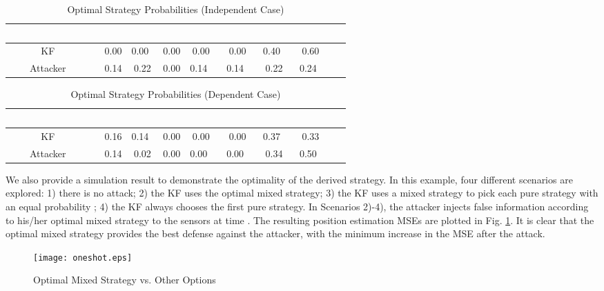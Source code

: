 \documentclass{article}
\begin{document}
  \begin{table}
	
 \caption{Optimal Strategy Probabilities (Independent Case)}
\vspace{0.1in}
{\footnotesize
  	\begin{tabular}{|c|c|c|c|c|c|c|c|}
		  	\hline
  	          &    &   &   &  &  &  &  \\ \hline
  	    KF       & 0.00 & 0.00  & 0.00 & 0.00  & 0.00  & 0.40   & 0.60     \\ 
  	    Attacker       & 0.14 & 0.22 & 0.00 & 0.14   & 0.14   & 0.22  & 0.24      \\ 
   \hline
  	\end{tabular}
  	}
  \label{table:independent_strategy}
  \end{table}
 \begin{table}
\small
\caption{Optimal Strategy Probabilities  (Dependent Case)}
\vspace{0.1in}
{\footnotesize
 	\begin{tabular}{|c|c|c|c|c|c|c|c|}
\hline
 	          &    &   &   &  &  &  &  \\ \hline
 	    KF       & 0.16 & 0.14  & 0.00 & 0.00  & 0.00  & 0.37   & 0.33     \\ 
 	    Attacker       & 0.14 & 0.02 & 0.00 & 0.00   & 0.00   & 0.34  & 0.50      \\ 
  \hline
 	\end{tabular}
 	}
 \label{table:dependent_strategy}
 \end{table}

We also provide a simulation result to demonstrate the optimality of the derived strategy. In this example, four different scenarios are explored: 1) there is no attack; 2) the KF uses the optimal mixed strategy; 3) the KF uses a mixed strategy to pick each pure strategy with an equal probability ; 4) the KF always chooses the first pure strategy. In Scenarios 2)-4), the attacker injects false information according to his/her optimal mixed strategy to the sensors at time .   The resulting position estimation MSEs are  plotted in Fig. \ref{fig:strategy}. It is clear that the optimal mixed strategy provides the best defense against the attacker, with the minimum increase in the MSE after the attack. 

\begin{figure}[htb]
 \centering
 {\texttt{[image: oneshot.eps]}}
 \caption{Optimal Mixed Strategy vs. Other Options}
 \label{fig:strategy}
 \end{figure}
\end{document}
